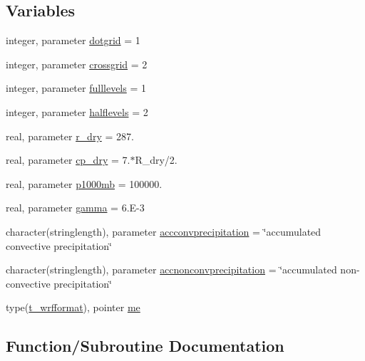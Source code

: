 \subsection*{Variables}
\begin{DoxyCompactItemize}
\item 
integer, parameter \mbox{\hyperlink{namespacemodulewrfformat_ae5346c607642bb08e89ac1ff57a740f1}{dotgrid}} = 1
\item 
integer, parameter \mbox{\hyperlink{namespacemodulewrfformat_a562cd5df35232824fd8cd4f0edda3921}{crossgrid}} = 2
\item 
integer, parameter \mbox{\hyperlink{namespacemodulewrfformat_ad275768ffc3918845d9acdd389b3ae46}{fulllevels}} = 1
\item 
integer, parameter \mbox{\hyperlink{namespacemodulewrfformat_a270e3c9e23ff9b3d0d5f35b0d60f8511}{halflevels}} = 2
\item 
real, parameter \mbox{\hyperlink{namespacemodulewrfformat_a2236075d1f043a07588786dffdfcf418}{r\+\_\+dry}} = 287.
\item 
real, parameter \mbox{\hyperlink{namespacemodulewrfformat_a7587eaf7b46174c3a6c5c0a5fd96d06c}{cp\+\_\+dry}} = 7.$\ast$R\+\_\+dry/2.
\item 
real, parameter \mbox{\hyperlink{namespacemodulewrfformat_a19972c1762f5019d8234d29fd8490039}{p1000mb}} = 100000.
\item 
real, parameter \mbox{\hyperlink{namespacemodulewrfformat_a7450ae50ccc588943891fd916a7fc713}{gamma}} = 6.\+E-\/3
\item 
character(stringlength), parameter \mbox{\hyperlink{namespacemodulewrfformat_ad1fc49a1e468e706f0718839d5abec25}{accconvprecipitation}} = \char`\"{}accumulated convective precipitation\char`\"{}
\item 
character(stringlength), parameter \mbox{\hyperlink{namespacemodulewrfformat_a13470954c6b6746858f10cce14718c6e}{accnonconvprecipitation}} = \char`\"{}accumulated non-\/convective precipitation\char`\"{}
\item 
type(\mbox{\hyperlink{structmodulewrfformat_1_1t__wrfformat}{t\+\_\+wrfformat}}), pointer \mbox{\hyperlink{namespacemodulewrfformat_ace240ee2fb9d24816a6fba3a2b6f9595}{me}}
\end{DoxyCompactItemize}


\subsection{Function/\+Subroutine Documentation}
\mbox{\label{namespacemodulewrfformat_a12d896f60aea7c34ec138f259778fcd0}} 
